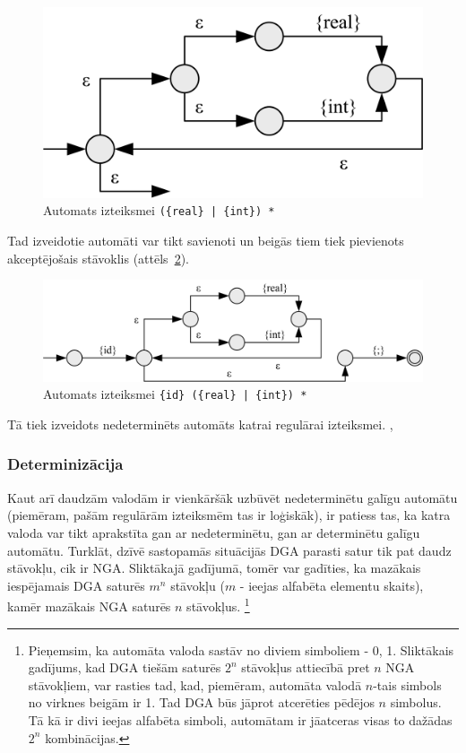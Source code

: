 \begin{figure}[H]
  \centering
    \includegraphics[scale=1.5]{pictures/auto_asterisk_ex}
  \caption{\label{fig:auto_asterisk_ex}Automats izteiksmei \texttt{(\{real\} | \{int\}) *}}
\end{figure}

Tad izveidotie automāti var tikt savienoti un beigās tiem tiek pievienots akceptējošais stāvoklis (attēls~\ref{fig:auto_full_ex}).

\begin{figure}[H]
  \centering
    \includegraphics[scale=1.25]{pictures/auto_full_ex}
  \caption{\label{fig:auto_full_ex}Automats izteiksmei \texttt{\{id\} (\{real\} | \{int\}) *}}
\end{figure}

Tā tiek izveidots nedeterminēts automāts katrai regulārai izteiksmei. \cite{Cox:RegexpMatchingFast}, \cite{DragonBook}

\subsubsection{Determinizācija}

Kaut arī daudzām valodām ir vienkāršāk uzbūvēt nedeterminētu galīgu automātu (piemēram, pašām regulārām izteiksmēm tas ir loģiskāk), ir patiess tas, ka katra valoda var tikt aprakstīta gan ar nedeterminētu, gan ar determinētu galīgu automātu. Turklāt, dzīvē sastopamās situācijās DGA parasti satur tik pat daudz stāvokļu, cik ir NGA. Sliktākajā gadījumā, tomēr var gadīties, ka mazākais iespējamais DGA saturēs $m^n$ stāvokļu ($m$ - ieejas alfabēta elementu skaits), kamēr mazākais NGA saturēs $n$ stāvokļus. \footnote{Pieņemsim, ka automāta valoda sastāv no diviem simboliem - {0, 1}. Sliktākais gadījums, kad DGA tiešām saturēs $2^n$ stāvokļus attiecībā pret $n$ NGA stāvokļiem, var rasties tad, kad, piemēram, automāta valodā $n$-tais simbols no virknes beigām ir 1. Tad DGA būs jāprot atcerēties pēdējos $n$ simbolus. Tā kā ir divi ieejas alfabēta simboli, automātam ir jāatceras visas to dažādas $2^n$ kombinācijas.}

